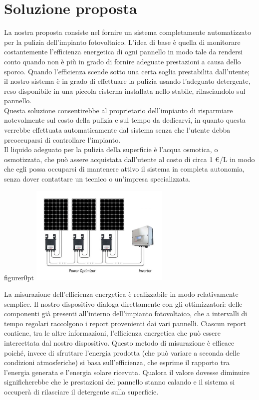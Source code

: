 \documentclass[a4paper, 12pt]{article}
\begin{document}
	\section{Soluzione proposta}
	La nostra proposta consiste nel fornire un sistema completamente automatizzato per la pulizia dell'impianto fotovoltaico. L'idea di base è quella di monitorare costantemente l'efficienza energetica di ogni pannello in modo tale da rendersi conto quando non è più in grado di fornire adeguate prestazioni a causa dello sporco. Quando l'efficienza scende sotto una certa soglia prestabilita dall'utente; il nostro sistema è in grado di effettuare la pulizia usando l'adeguato detergente, reso disponibile in una piccola cisterna installata nello stabile, rilasciandolo sul pannello.\\
	Questa soluzione consentirebbe al proprietario dell'impianto di risparmiare notevolmente sul costo della pulizia e sul tempo da dedicarvi, in quanto questa verrebbe effettuata automaticamente dal sistema senza che l'utente debba preoccuparsi di controllare l'impianto.\\
	Il liquido adeguato per la pulizia della superficie è l'acqua osmotica, o osmotizzata, che può assere acquistata dall'utente al costo di circa 1 \euro/L in modo che egli possa occuparsi di mantenere attivo il sistema in completa autonomia, senza dover contattare un tecnico o un'impresa specializzata.\\
	\begin{wrapfloat}{figure}{r}{0pt}
		\includegraphics[width=0.5\textwidth]{Images/ottimizzatori.jpg}
	\end{wrapfloat}
	La misurazione dell'efficienza energetica è realizzabile in modo relativamente semplice. Il nostro dispositivo dialoga direttamente con gli ottimizzatori: delle componenti già presenti all'interno dell'impianto fotovoltaico, che a intervalli di tempo regolari raccolgono i report provenienti dai vari pannelli. Ciascun report contiene, tra le altre informazioni, l'efficienza energetica che può essere intercettata dal nostro dispositivo. Questo metodo di misurazione è efficace poiché, invece di sfruttare l'energia prodotta (che può variare a seconda delle condizioni atmosferiche) si basa sull'efficienza, che esprime il rapporto tra l'energia generata e l'energia solare ricevuta. Qualora il valore dovesse diminuire significherebbe che le prestazioni del pannello stanno calando e il sistema si occuperà di rilasciare il detergente sulla superficie.
\end{document}

